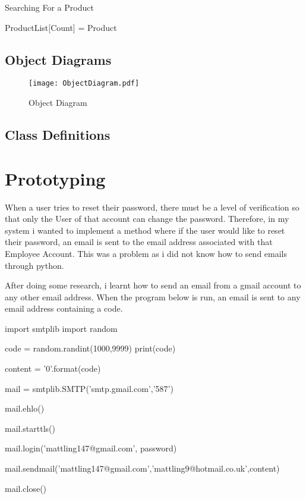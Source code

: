 \begin{algorithm}[H]
\label{fig:repeat_pseudo_example}
\caption{Searching For a Product}
\begin{algorithmic}[1]
		ProductList[Count] = Product
	\EndIf
\EndFor
\EndFunction
\end{algorithmic}
\end{algorithm}


\subsection{Object Diagrams}

\begin{figure}[H]
\caption{Object Diagram} \label{fig:Object Diagram}
\hfill\texttt{[image: ObjectDiagram.pdf]}\hspace*{\fill}
\end{figure}

\subsection{Class Definitions}

\section{Prototyping}

When a user tries to reset their password, there must be a level of verification so that only the User of that account can change the password. Therefore, in my system i wanted to implement a method where if the user would like to reset their password, an email is sent to the email address associated with that Employee Account. This was a problem as i did not know how to send emails through python. \par

After doing some research, i learnt how to send an email from a gmail account to any other email address. When the program below is run, an email is sent to any email address containing a code.

\begin{python}
import smtplib
import random

code = random.randint(1000,9999)
print(code)

content = '{0}'.format(code)

mail = smtplib.SMTP('smtp.gmail.com','587')

mail.ehlo()

mail.starttls()

mail.login('mattling147@gmail.com', password)

mail.sendmail('mattling147@gmail.com','mattling9@hotmail.co.uk',content)

mail.close()

\end{python}

